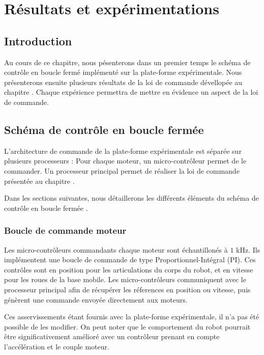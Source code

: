 \chapter{Résultats et expérimentations}
\label{chapitre.resultats}
	\section{Introduction}
	
	Au cours de ce chapitre, nous pésenterons dans un premier temps le schéma de contrôle en boucle fermé implémenté sur la plate-forme expérimentale.
	Nous présenterons ensuite plusieurs résultats de la loi de commande dévellopée au chapitre .
	Chaque expérience permettra de mettre en évidence un aspect de la loi de commande.
	
	\section{Schéma de contrôle en boucle fermée}
	\label{section.closedloop}
	
	
	L'architecture de commande de la plate-forme expérimentale est séparée sur plusieurs processeurs : 
	Pour chaque moteur, un micro-contrôleur permet de le commander. 
	Un processeur principal permet de réaliser la loi de commande présentée au chapitre .
	
	Dans les sections suivantes, nous détaillerons les différents éléments du schéma de contrôle en boucle fermée .
	
	\subsection{Boucle de commande moteur}
	
	  Les micro-contrôleurs commandants chaque moteur sont échantillonés à $1$ kHz.
	  Ils implémentent une boucle de commande de type Proportionnel-Intégral (PI).
	  Ces contrôles sont en position pour les articulations du corps du robot, et en vitesse pour les roues de la base mobile.
	  Les micro-contrôleurs communiquent avec le processeur principal afin de récupérer les réferences en position ou vitesse, puis génèrent une commande envoyée directement aux moteurs.
	  
	  Ces asservissements étant fournis avec la plate-forme expérimentale, il n'a pas été possible de les modifier. 
	  On peut noter que le comportement du robot pourrait être significativement amélioré avec un contrôleur prenant en compte l'accélération et le couple moteur.
	
